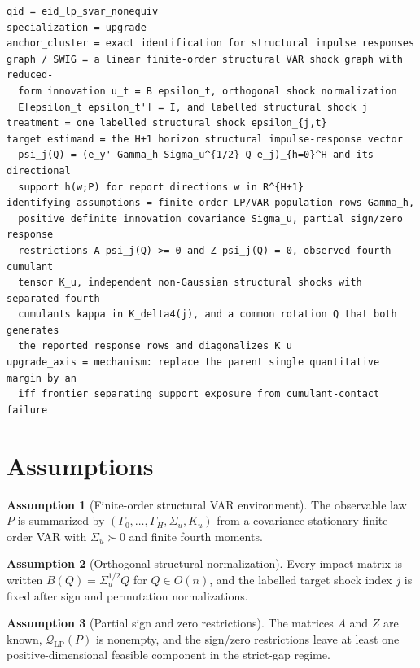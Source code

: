 \documentclass[11pt]{article}
\theoremstyle{definition}
\newtheorem{assumption}{Assumption}
\theoremstyle{plain}
\theoremstyle{remark}
\begin{document}
\begin{verbatim}
qid = eid_lp_svar_nonequiv
specialization = upgrade
anchor_cluster = exact identification for structural impulse responses
graph / SWIG = a linear finite-order structural VAR shock graph with reduced-
  form innovation u_t = B epsilon_t, orthogonal shock normalization
  E[epsilon_t epsilon_t'] = I, and labelled structural shock j
treatment = one labelled structural shock epsilon_{j,t}
target estimand = the H+1 horizon structural impulse-response vector
  psi_j(Q) = (e_y' Gamma_h Sigma_u^{1/2} Q e_j)_{h=0}^H and its directional
  support h(w;P) for report directions w in R^{H+1}
identifying assumptions = finite-order LP/VAR population rows Gamma_h,
  positive definite innovation covariance Sigma_u, partial sign/zero response
  restrictions A psi_j(Q) >= 0 and Z psi_j(Q) = 0, observed fourth cumulant
  tensor K_u, independent non-Gaussian structural shocks with separated fourth
  cumulants kappa in K_delta4(j), and a common rotation Q that both generates
  the reported response rows and diagonalizes K_u
upgrade_axis = mechanism: replace the parent single quantitative margin by an
  iff frontier separating support exposure from cumulant-contact failure
\end{verbatim}

\section{Assumptions}
\begin{assumption}[Finite-order structural VAR environment]\label{ass:finite-var}
The observable law \(P\) is summarized by \((\Gamma_0,\ldots,\Gamma_H,\Sigma_u,K_u)\) from a covariance-stationary finite-order VAR with \(\Sigma_u\succ0\) and finite fourth moments.
\end{assumption}

\begin{assumption}[Orthogonal structural normalization]\label{ass:orthogonal}
Every impact matrix is written \(B(Q)=\Sigma_u^{1/2}Q\) for \(Q\in O(n)\), and the labelled target shock index \(j\) is fixed after sign and permutation normalizations.
\end{assumption}

\begin{assumption}[Partial sign and zero restrictions]\label{ass:sign-zero}
The matrices \(A\) and \(Z\) are known, \(\mathcal Q_{\mathrm{LP}}(P)\) is nonempty, and the sign/zero restrictions leave at least one positive-dimensional feasible component in the strict-gap regime.
\end{assumption}
\end{document}
